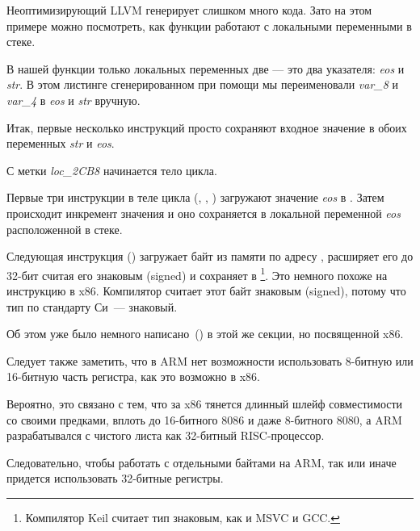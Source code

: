 ﻿

\mysubparagraph{\NonOptimizingXcodeIV (\ARMMode)}



Неоптимизирующий LLVM генерирует слишком много кода. Зато на этом примере можно посмотреть, 
как функции работают с локальными переменными в стеке.

В нашей функции только локальных переменных две --- это два указателя:
\emph{eos} и \emph{str}.
В этом листинге сгенерированном при помощи \IDA мы переименовали \emph{var\_8} и \emph{var\_4} в \emph{eos} и \emph{str} вручную.%

Итак, первые несколько инструкций просто сохраняют входное значение в обоих переменных \emph{str} и \emph{eos}.

С метки \emph{loc\_2CB8} начинается тело цикла.

Первые три инструкции в теле цикла (, \ADD, ) 
загружают значение \emph{eos} в . 
Затем происходит инкремент значения и оно сохраняется в локальной переменной \emph{eos} расположенной 
в стеке.

Следующая инструкция  () 
загружает байт из памяти по адресу , расширяет его до 32-бит считая его знаковым (signed) 
и сохраняет в 
\footnote{Компилятор Keil считает тип \Tchar знаковым, как и MSVC и GCC.}.
Это немного похоже на инструкцию \MOVSX в x86.
Компилятор считает этот байт знаковым (signed), потому что тип \Tchar по стандарту Си~--- знаковый.

Об этом уже было немного написано~() в этой же секции, но посвященной x86.

Следует также заметить, что в ARM нет возможности использовать 8-битную или 16-битную часть 
регистра, как это возможно в x86.

Вероятно, это связано с тем, что за x86 тянется длинный шлейф совместимости со своими предками, 
вплоть до 16-битного 8086 и даже 8-битного 8080, 
а ARM разрабатывался с чистого листа как 32-битный RISC-процессор.

Следовательно, чтобы работать с отдельными байтами на ARM, так или иначе придется использовать 
32-битные регистры.

